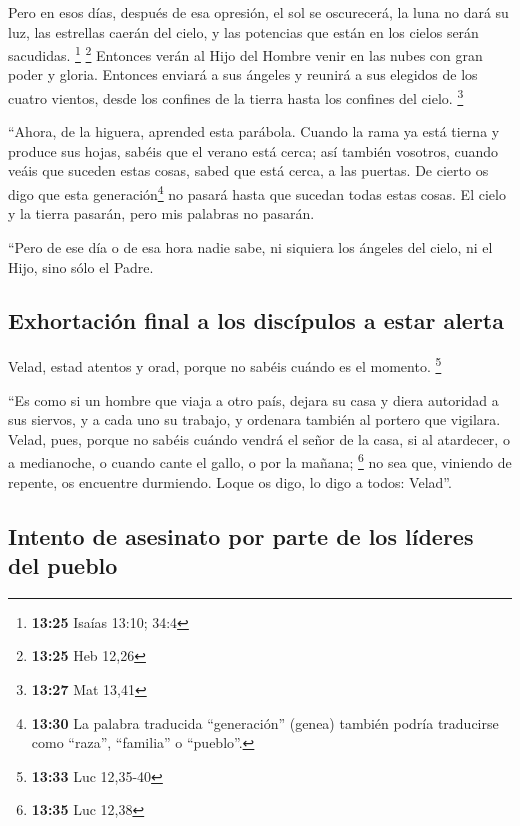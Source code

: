 Pero en esos días, después de esa opresión, el sol se
oscurecerá, la luna no dará su luz,  las estrellas caerán
del cielo, y las potencias que están en los cielos serán sacudidas.
\footnote{\textbf{13:25} Isaías 13:10; 34:4} \footnote{\textbf{13:25}
  Heb 12,26}  Entonces verán al Hijo del Hombre venir en
las nubes con gran poder y gloria.  Entonces enviará a
sus ángeles y reunirá a sus elegidos de los cuatro vientos, desde los
confines de la tierra hasta los confines del cielo. \footnote{\textbf{13:27}
  Mat 13,41}

 ``Ahora, de la higuera, aprended esta parábola. Cuando
la rama ya está tierna y produce sus hojas, sabéis que el verano está
cerca;  así también vosotros, cuando veáis que suceden
estas cosas, sabed que está cerca, a las puertas.  De
cierto os digo que esta generación\footnote{\textbf{13:30} La palabra
  traducida ``generación'' (genea) también podría traducirse como
  ``raza'', ``familia'' o ``pueblo''.} no pasará hasta que sucedan todas
estas cosas.  El cielo y la tierra pasarán, pero mis
palabras no pasarán.

 ``Pero de ese día o de esa hora nadie sabe, ni siquiera
los ángeles del cielo, ni el Hijo, sino sólo el Padre.

\hypertarget{exhortaciuxf3n-final-a-los-discuxedpulos-a-estar-alerta}{%
\subsection{Exhortación final a los discípulos a estar
alerta}\label{exhortaciuxf3n-final-a-los-discuxedpulos-a-estar-alerta}}

 Velad, estad atentos y orad, porque no sabéis cuándo es
el momento. \footnote{\textbf{13:33} Luc 12,35-40}

 ``Es como si un hombre que viaja a otro país, dejara su
casa y diera autoridad a sus siervos, y a cada uno su trabajo, y
ordenara también al portero que vigilara.  Velad, pues,
porque no sabéis cuándo vendrá el señor de la casa, si al atardecer, o a
medianoche, o cuando cante el gallo, o por la mañana; \footnote{\textbf{13:35}
  Luc 12,38}  no sea que, viniendo de repente, os
encuentre durmiendo.  Loque os digo, lo digo a todos:
Velad''.

\hypertarget{intento-de-asesinato-por-parte-de-los-luxedderes-del-pueblo}{%
\subsection{Intento de asesinato por parte de los líderes del
pueblo}\label{intento-de-asesinato-por-parte-de-los-luxedderes-del-pueblo}}

